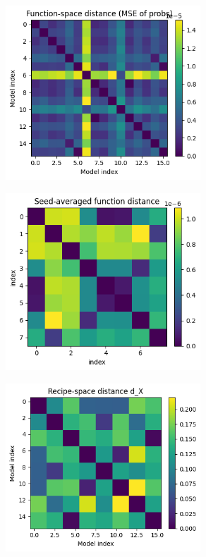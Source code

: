 \documentclass[12pt]{article}
\begin{document}
\begin{figure}[h]
    \centering
    \includegraphics[width=0.65\textwidth]{figures/A5/local continuity/function-space distance.png}
\end{figure}

\begin{figure}[h]
    \centering
    \includegraphics[width=0.65\textwidth]{figures/A5/local continuity/m_phi function distance.png}
\end{figure}

\begin{figure}[h]
    \centering
    \includegraphics[width=0.65\textwidth]{figures/A5/local continuity/recipe-space distance.png}
\end{figure}
\end{document}
